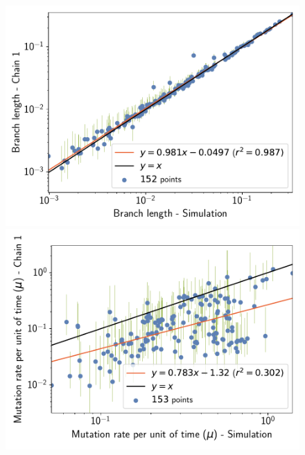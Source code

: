 \documentclass{article}
\begin{document}
	\begin{figure}[H]
		\centering
		\begin{minipage}{0.32\linewidth}
			\includegraphics[width=\linewidth, page=1]{simulations/BranchWise_SimuDiv_SiteMutSelBranchNe_BranchCorrelation_Log10BranchLength}
		\end{minipage} \hfill
		\begin{minipage}{0.32\linewidth}
			\includegraphics[width=\linewidth, page=1]{simulations/BranchWise_SimuDiv_SiteMutSelBranchNe_BranchCorrelation_LogMutationRatePerTime}
		\end{minipage} \hfill
		\begin{minipage}{0.32\linewidth}

\end{minipage}
\end{figure}
\end{document}

